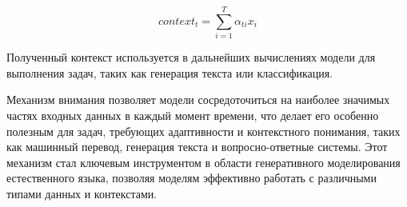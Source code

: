 \[ context_t = \sum_{i=1}^{T} \alpha_{ti} x_i \]

Полученный контекст используется в дальнейших вычислениях модели для выполнения задач, таких как генерация текста или классификация.

Механизм внимания позволяет модели сосредоточиться на наиболее значимых частях входных данных в каждый момент времени, что делает его особенно полезным для задач, требующих адаптивности и контекстного понимания, таких как машинный перевод, генерация текста и вопросно-ответные системы. Этот механизм стал ключевым инструментом в области генеративного моделирования естественного языка, позволяя моделям эффективно работать с различными типами данных и контекстами.


